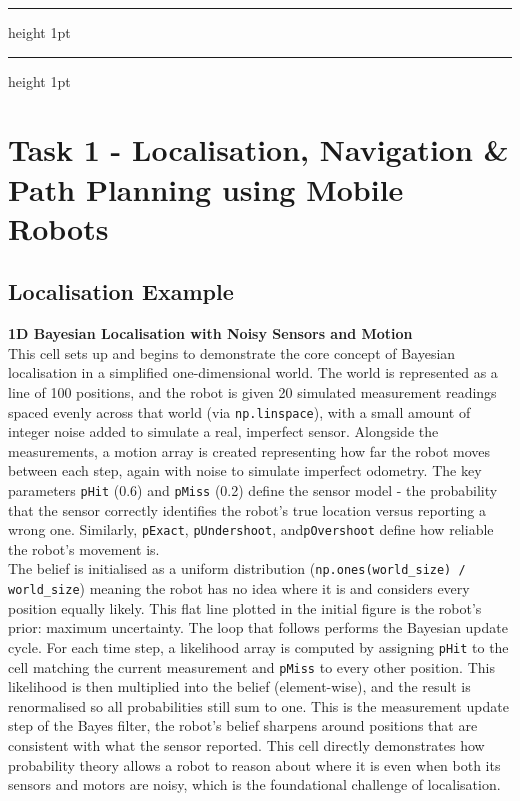 \documentclass[11 pt , a 4 paper ]{article}
\theoremstyle{definition}
\begin{document}
	\vskip 7pt
	{\color{aqua}\hrule height 1pt}
	{\color{grey}\hrule height 1pt}
	
	\vskip 5pt

  \section*{Task 1 - Localisation, Navigation \& Path Planning using Mobile Robots}

  \subsection*{Localisation Example}
  \textbf{1D Bayesian Localisation with Noisy Sensors and Motion}\\
  \newline \noindent This cell sets up and begins to demonstrate the core concept of Bayesian localisation in a simplified one-dimensional world. The world is represented as a line of 100 positions, and the robot is given 20 simulated measurement readings spaced evenly across that world (via \texttt{np.linspace}), with a small amount of integer noise added to simulate a real, imperfect sensor. Alongside the measurements, a motion array is created representing how far the robot moves between each step, again with noise to simulate imperfect odometry. The key parameters \texttt{pHit} (0.6) and \texttt{pMiss} (0.2) define the sensor model - the probability that the sensor correctly identifies the robot's true location versus reporting a wrong one. Similarly, \texttt{pExact}, \texttt{pUndershoot}, and\texttt{pOvershoot} define how reliable the robot's movement is. \\ 
  \newline \noindent The belief is initialised as a uniform distribution (\texttt{np.ones(world\_size) / world\_size}) meaning the robot has no idea where it is and considers every position equally likely. This flat line plotted in the initial figure is the robot's prior: maximum uncertainty. The loop that follows performs the Bayesian update cycle. For each time step, a likelihood array is computed by assigning \texttt{pHit} to the cell matching the current measurement and \texttt{pMiss} to every other position. This likelihood is then multiplied into the belief (element-wise), and the result is renormalised so all probabilities still sum to one. This is the measurement update step of the Bayes filter, the robot's belief sharpens around positions that are consistent with what the sensor reported. This cell directly demonstrates how probability theory allows a robot to reason about where it is even when both its sensors and motors are noisy, which is the foundational challenge of localisation.
\end{document}
